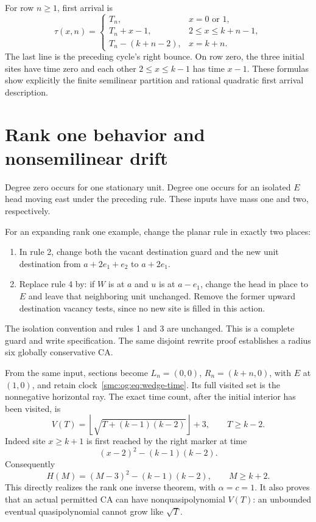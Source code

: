 \documentclass[11pt,letterpaper]{article}
\numberwithin{equation}{section}
\theoremstyle{definition}
\theoremstyle{remark}
\begin{document}
For row $n\ge1$, first arrival is
\begin{equation}\label{smc:og:eq:wedge-arrival}
 \tau(x,n)=
 \begin{cases}
 T_n,&x=0\text{ or }1,\\
 T_n+x-1,&2\le x\le k+n-1,\\
 T_n-(k+n-2),&x=k+n.
 \end{cases}
\end{equation}
The last line is the preceding cycle's right bounce. On row zero, the three initial sites have time zero and each other $2\le x\le k-1$ has time $x-1$. These formulas show explicitly the finite semilinear partition and rational quadratic first arrival description.

\section{Rank one behavior and nonsemilinear drift}\label{smc:og:sec:rankone}
Degree zero occurs for one stationary unit. Degree one occurs for an isolated $E$ head moving east under the preceding rule. These inputs have mass one and two, respectively.

For an expanding rank one example, change the planar rule in exactly two places:
\begin{enumerate}
\item In rule 2, change both the vacant destination guard and the new unit destination from $a+2e_1+e_2$ to $a+2e_1$.
\item Replace rule 4 by: if $W$ is at $a$ and $u$ is at $a-e_1$, change the head in place to $E$ and leave that neighboring unit unchanged. Remove the former upward destination vacancy tests, since no new site is filled in this action.
\end{enumerate}
The isolation convention and rules 1 and 3 are unchanged. This is a complete guard and write specification. The same disjoint rewrite proof establishes a radius six globally conservative CA.

From the same input, sections become $L_n=(0,0)$, $R_n=(k+n,0)$, with $E$ at $(1,0)$, and retain clock~\eqref{smc:og:eq:wedge-time}. Its full visited set is the nonnegative horizontal ray. The exact time count, after the initial interior has been visited, is
\begin{equation}\label{smc:og:eq:rankone-V}
 V(T)=\left\lfloor\sqrt{T+(k-1)(k-2)}\right\rfloor+3,
 \qquad T\ge k-2.
\end{equation}
Indeed site $x\ge k+1$ is first reached by the right marker at time
\[
 (x-2)^2-(k-1)(k-2).
\]
Consequently
\begin{equation}\label{smc:og:eq:rankone-H}
 H(M)=(M-3)^2-(k-1)(k-2),\qquad M\ge k+2.
\end{equation}
This directly realizes the rank one inverse theorem, with $\alpha=c=1$. It also proves that an actual permitted CA can have nonquasipolynomial $V(T)$: an unbounded eventual quasipolynomial cannot grow like $\sqrt T$.
\end{document}
